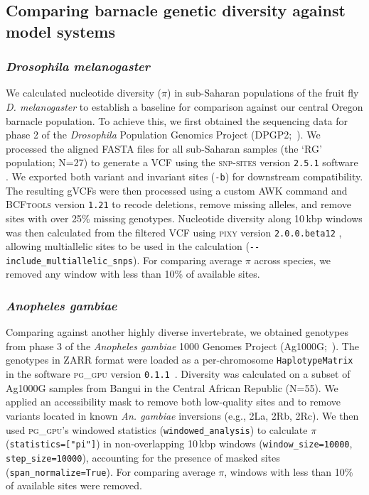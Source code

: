 \subsection*{Comparing barnacle genetic diversity against model systems}

\subsubsection*{\textit{Drosophila melanogaster}}

We calculated nucleotide diversity ($\pi$) in sub-Saharan populations of the fruit fly
\textit{D. melanogaster} to establish a baseline for comparison against our central Oregon
barnacle population.
To achieve this, we first obtained the sequencing data for phase 2 of the \textit{Drosophila}
Population Genomics Project (DPGP2;~\citealp{pool_population_2012,lack_dpgp_2016}).
We processed the aligned FASTA files for all sub-Saharan samples (the `RG' population;
N=27) to generate a VCF using the \textsc{snp-sites} version \texttt{2.5.1} software
\citep{page_snp-sites_2016}.
We exported both variant and invariant sites (\texttt{-b}) for downstream compatibility.
The resulting gVCFs were then processed using a custom AWK command and \textsc{BCFtools}
version \texttt{1.21} \citep{danecek_bcftools_2021} to recode deletions, remove missing
alleles, and remove sites with over 25\% missing genotypes.
Nucleotide diversity along 10\,kbp windows was then calculated from the filtered VCF using
\textsc{pixy} version \texttt{2.0.0.beta12} \citep{korunes_pixy_2021,bailey_pixy2_2025},
allowing multiallelic sites to be used in the calculation
(\texttt{-{}-include\_multiallelic\_snps}).
For comparing average $\pi$ across species, we removed any window with less than 10\%
of available sites.

\subsubsection*{\textit{Anopheles gambiae}}

Comparing against another highly diverse invertebrate, we obtained genotypes from phase 3 of
the \textit{Anopheles gambiae} 1000 Genomes Project (Ag1000G;~\citealp{ag1000g,ag1000g_ag3}).
The genotypes in ZARR format were loaded as a per-chromosome \texttt{HaplotypeMatrix} in the
software \textsc{pg\_gpu} version \texttt{0.1.1}~\citep{pope_gpu_2026}.
Diversity was calculated on a subset of Ag1000G samples from Bangui in the Central African Republic (N=55).
We applied an accessibility mask to remove both low-quality sites and to remove variants
located in known \textit{An. gambiae} inversions (e.g., 2La, 2Rb, 2Rc).
We then used \textsc{pg\_gpu}'s windowed statistics (\texttt{windowed\_analysis}) to calculate
$\pi$ (\texttt{statistics=["pi"]}) in non-overlapping 10\,kbp windows (\texttt{window\_size=10000},
\texttt{step\_size=10000}), accounting for the presence of masked sites (\texttt{span\_normalize=True}).
For comparing average $\pi$, windows with less than 10\% of available sites were removed.

